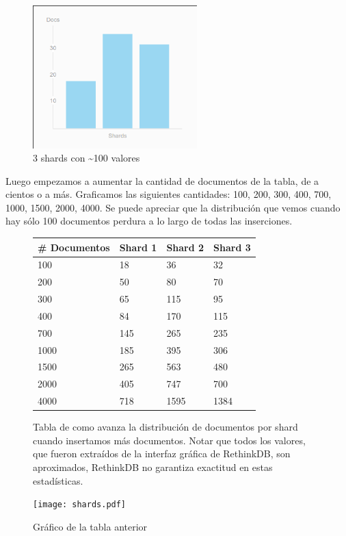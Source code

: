 \begin{figure}[H]
 \centering
 \includegraphics[width=2.5in]{sharding/img/3shard100.png}
 \caption{3 shards con \textasciitilde 100 valores}
 \label{fig:3shard100}
\end{figure}

Luego empezamos a aumentar la cantidad de documentos de la tabla, de a cientos o a más. Graficamos las siguientes cantidades: 100, 200, 300, 400, 700, 1000, 1500, 2000, 4000. Se puede apreciar que la distribución que vemos cuando hay sólo 100 documentos perdura a lo largo de todas las inserciones.

\begin{figure}[H]
\centering
\begin{tabular}{|l | l | l | l|}
  \hline
  \# Documentos & Shard 1 & Shard 2 & Shard 3 \\
  \hline
  100           & 18  & 36  & 32 \\
  200           & 50  & 80  & 70 \\
  300           & 65  & 115 & 95 \\
  400           & 84  & 170 & 115 \\
  700           & 145 & 265 & 235 \\
  1000          & 185 & 395 & 306 \\
  1500          & 265 & 563 & 480 \\
  2000          & 405 & 747 & 700 \\
  4000          & 718 & 1595 & 1384 \\
  \hline
\end{tabular}
 \caption{Tabla de como avanza la distribución de documentos por shard cuando insertamos más documentos. Notar que todos los valores, que fueron extraídos de la interfaz gráfica de RethinkDB, son aproximados, RethinkDB no garantiza exactitud en estas estadísticas.}
 \label{fig:shardstabla}
\end{figure}


\begin{figure}[H]
 \centering
 \texttt{[image: shards.pdf]}
 \caption{Gráfico de la tabla anterior}
 \label{fig:shardslinea}
\end{figure}



